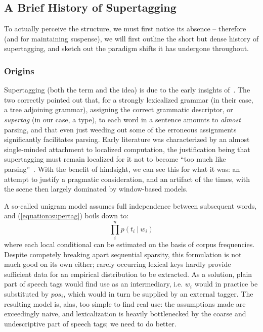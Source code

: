 \subsection{A Brief History of Supertagging}
To actually perceive the structure, we must first notice its absence -- therefore (and for maintaining suspense), we will first outline the short but dense history of supertagging, and sketch out the paradigm shifts it has undergone throughout.

\subsubsection{Origins}
Supertagging (both the term and the idea) is due to the early insights of~\citet{joshi1994disambiguation}.
The two correctly pointed out that, for a strongly lexicalized grammar (in their case, a tree adjoining grammar), assigning the correct grammatic descriptor, or \textit{supertag} (in our case, a type), to each word in a sentence amounts to \textit{almost} parsing, and that even just weeding out some of the erroneous assignments significantly facilitates parsing.
Early literature was characterized by an almost single-minded attachment to localized computation, the justification being that supertagging must remain localized for it not to become ``too much like parsing''~\cite{bangalore1999supertagging}.
With the benefit of hindsight, we can see this for what it was: an attempt to justify a pragmatic consideration, and an artifact of the times, with the scene then largely dominated by window-based models.

A so-called unigram model assumes full independence between subsequent words, and (\ref{equation:supertag}) boils down to:
\begin{equation}
\prod_i^n p(t_i \ | \ w_i)
\end{equation}
where each local conditional can be estimated on the basis of corpus frequencies.
Despite competely breaking apart sequential sparsity, this formulation is not much good on its own either; rarely occurring lexical keys hardly provide sufficient data for an empirical distribution to be extracted.
As a solution, plain part of speech tags would find use as an intermediary, i.e. $w_i$ would in practice be substituted by $pos_i$, which would in turn be supplied by an external tagger.
The resulting model is, alas, too simple to find real use: the assumptions made are exceedingly naive, and lexicalization is heavily bottlenecked by the coarse and undescriptive part of speech tags; we need to do better.

